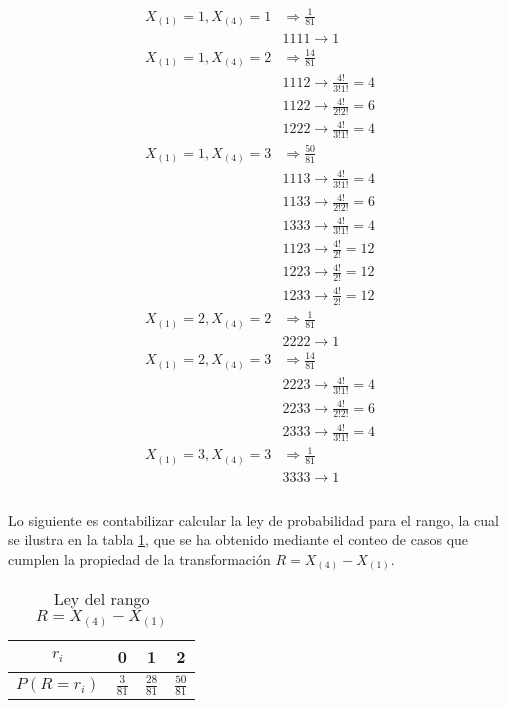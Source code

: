 \documentclass{article}
\begin{document}
      \begin{align*}
        X_{(1)} = 1,X_{(4)} = 1 & \Rightarrow \frac{1}{81}\\
        &1111 \rightarrow 1 \\
        X_{(1)} = 1,X_{(4)} = 2 & \Rightarrow \frac{14}{81}\\
        &1112 \rightarrow \frac{4!}{3!1!} = 4 \\
        &1122 \rightarrow \frac{4!}{2!2!} = 6  \\
        &1222 \rightarrow \frac{4!}{3!1!} = 4  \\
        X_{(1)} = 1,X_{(4)} = 3 & \Rightarrow \frac{50}{81}\\
        &1113 \rightarrow \frac{4!}{3!1!} = 4 \\
        &1133 \rightarrow \frac{4!}{2!2!} = 6  \\
        &1333 \rightarrow \frac{4!}{3!1!} = 4  \\
        &1123 \rightarrow \frac{4!}{2!} = 12 \\
        &1223 \rightarrow \frac{4!}{2!} = 12  \\
        &1233 \rightarrow \frac{4!}{2!} = 12  \\
        X_{(1)} = 2,X_{(4)} = 2 & \Rightarrow \frac{1}{81}\\
        &2222 \rightarrow 1 \\
        X_{(1)} = 2,X_{(4)} = 3 & \Rightarrow \frac{14}{81}\\
        &2223 \rightarrow \frac{4!}{3!1!} = 4 \\
        &2233 \rightarrow \frac{4!}{2!2!} = 6  \\
        &2333 \rightarrow \frac{4!}{3!1!} = 4  \\
        X_{(1)} = 3,X_{(4)} = 3 & \Rightarrow \frac{1}{81}\\
        &3333 \rightarrow 1 \\
      \end{align*}

      \paragraph{}
      Lo siguiente es contabilizar calcular la ley de probabilidad para el rango, la cual se ilustra en la tabla \ref{table:range}, que se ha obtenido mediante el conteo de casos que cumplen la propiedad de la transformación $R=X_{(4)} - X_{(1)}$.


      \begin{table}[H]
        \centering
        \begin{tabular}{ c | c c c |}
          $r_i$       & 0             & 1             & 2 \\ \hline
          $P(R = r_i)$  & $\frac{3}{81}$  & $\frac{28}{81}$ & $\frac{50}{81}$
        \end{tabular}
        \caption{Ley del rango $R=X_{(4)} - X_{(1)}$}
        \label{table:range}
      \end{table}
\end{document}
